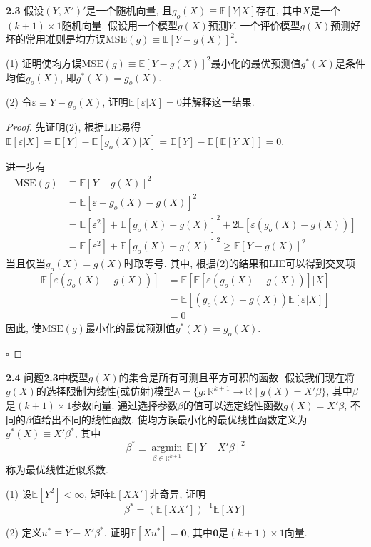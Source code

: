 \documentclass[cn,12pt,math=mtpro2,citestyle=gb7714-2015,bibstyle=gb7714-2015,twocol,mode=simple]{elegantbook}
\newcommand{\E}{\mathbb{E}}
\begin{document}
\textbf{2.3} 假设$(Y,X')'$是一个随机向量, 且$g_o(X)\equiv \E[Y|X]$存在, 其中$X$是一个$(k+1)\times 1$随机向量. 假设用一个模型$g(X)$预测$Y$. 一个评价模型$g(X)$预测好坏的常用准则是均方误$\text{MSE}(g)\equiv \E[Y-g(X)]^2$.

(1) 证明使均方误$\text{MSE}(g)\equiv \E[Y-g(X)]^2$最小化的最优预测值$g^{\ast}(X)$是条件均值$g_o(X)$, 即$g^{\ast}(X)=g_o(X)$.

(2) 令$\varepsilon \equiv Y-g_o(X)$, 证明$\E[\varepsilon|X]=0$并解释这一结果.

\begin{proof}
  先证明(2), 根据LIE易得$\E[\varepsilon|X]=\E[Y]-\E[g_o(X)|X]=\E[Y]-\E[\E[Y|X]]=0$.

  进一步有
  \begin{align}
  \text{MSE}(g)&\equiv \E[Y-g(X)]^2 \nonumber \\
  &=\E[\varepsilon+g_o(X)-g(X)]^2 \nonumber \\
  &=\E[\varepsilon^2]+\E[g_o(X)-g(X)]^2+2\E[\varepsilon(g_o(X)-g(X))] \nonumber \\
  &=\E[\varepsilon^2]+\E[g_o(X)-g(X)]^2 \geq \E[Y-g(X)]^2 \nonumber
  \end{align}
  当且仅当$g_o(X)=g(X)$时取等号. 其中, 根据(2)的结果和LIE可以得到交叉项
  \begin{align}
  \E[\varepsilon(g_o(X)-g(X))]&=\E[\E[\varepsilon(g_o(X)-g(X))]|X] \nonumber \\
  &=\E[(g_o(X)-g(X))\E[\varepsilon|X]] \nonumber \\
  &=0 \nonumber
  \end{align}
  因此, 使$\text{MSE}(g)$最小化的最优预测值$g^{\ast}(X)=g_o(X)$.

  $\square$
\end{proof}

\textbf{2.4} 问题\textbf{2.3}中模型$g(X)$的集合是所有可测且平方可积的函数. 假设我们现在将$g(X)$的选择限制为线性(或仿射)模型$\mathbb{A}=\{g: \mathbb{R}^{k+1} \rightarrow \mathbb{R} \mid g(X)=X'\beta \}$, 其中$\beta$是$(k+1)\times 1$参数向量. 通过选择参数$\beta$的值可以选定线性函数$g(X)=X'\beta$, 不同的$\beta$值给出不同的线性函数. 使均方误最小化的最优线性函数定义为$g^{\ast}(X)\equiv X'\beta^{\ast}$, 其中
$$\beta^{\ast}\equiv\underset{\beta \in \mathbb{R}^{k+1}}{\operatorname{\arg\min}}\,\E[Y-X'\beta]^2 $$
称为最优线性近似系数.

(1) 设$\E[Y^2]<\infty$, 矩阵$\E[XX']$非奇异, 证明
$$\beta^{\ast}=(\E[XX'])^{-1}\E[XY]$$

(2) 定义$u^{\ast}\equiv Y-X'\beta^{\ast}$. 证明$\E[Xu^{\ast}]=\mathbf{0}$, 其中$\mathbf{0}$是$(k+1)\times1$向量.
\end{document}
